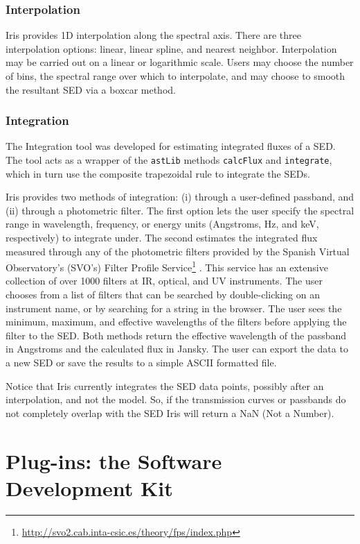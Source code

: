 \documentclass[preprint,authoryear,5p]{elsarticle}
\begin{document}
\subsubsection{Interpolation} Iris provides 1D interpolation along the spectral
axis. There are three interpolation options: linear, linear spline, and nearest
neighbor. Interpolation may be carried out on a linear or logarithmic scale.
Users may choose the number of bins, the spectral range over which to
interpolate, and may choose to smooth the resultant SED via a boxcar method.

\subsubsection{Integration}
The Integration tool was developed for
estimating integrated fluxes of a SED. The tool acts as a wrapper of the
\texttt{astLib} methods \texttt{calcFlux} and \texttt{integrate}, which in turn use
the composite trapezoidal rule to integrate the SEDs.

Iris provides two
methods of integration: (i) through a user-defined passband, and (ii) through a
photometric filter. The first option lets the user specify the spectral range in
wavelength, frequency, or energy units (Angstroms, Hz, and keV, respectively) to
integrate under. The second estimates the integrated flux measured through any
of the photometric filters provided by the Spanish Virtual Observatory's (SVO's)
Filter Profile
Service\footnote{\url{http://svo2.cab.inta-csic.es/theory/fps/index.php}}
\citep{2013arXiv1312.3249S}. This service has an extensive collection
of over 1000 filters at IR, optical, and UV
instruments. The user chooses from a list of filters
that can be searched by double-clicking on an instrument name, or by searching
for a string in the browser. The user sees the minimum, maximum, and effective
wavelengths of the filters before applying the filter to the SED.
Both methods return the effective wavelength of the passband in Angstroms and
the calculated flux in Jansky. The user can export the data to a new SED or
save the results to a simple ASCII formatted file.

Notice that Iris currently integrates the SED data points, possibly after an interpolation,
and not the model. So, if the transmission curves or passbands do not completely overlap with the SED
Iris will return a NaN (Not a Number).

\section{Plug-ins: the Software Development Kit} \label{sec:plugins}
\end{document}

